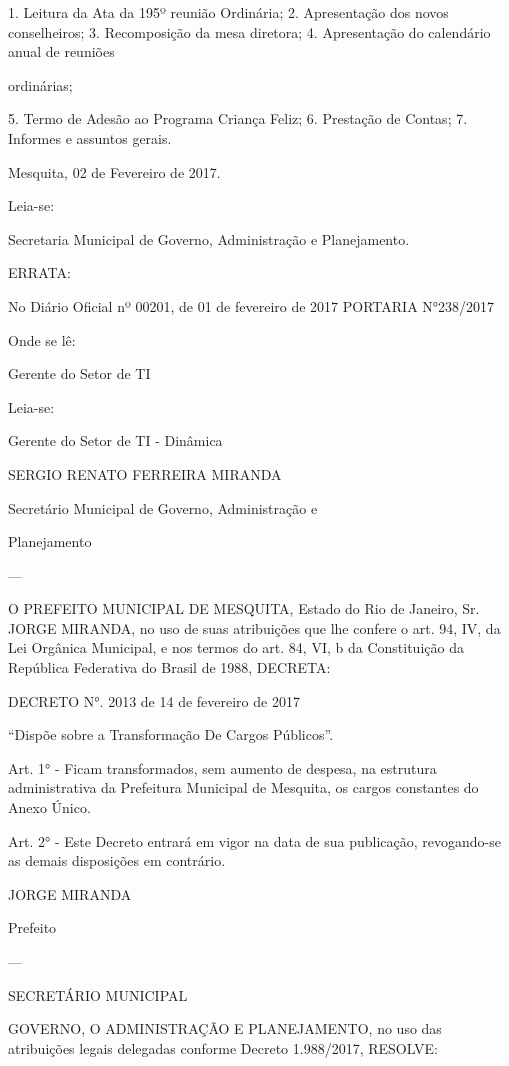\documentclass{doliberto}
\begin{document}
1.  Leitura da Ata da 195º reunião Ordinária; 
2.  Apresentação dos novos conselheiros; 
3.  Recomposição da mesa diretora; 
4.  Apresentação  do  calendário  anual  de  reuniões 

ordinárias; 

5.  Termo de Adesão ao Programa Criança Feliz; 
6.  Prestação de Contas; 
7.  Informes e assuntos gerais. 

Mesquita, 02 de Fevereiro de 2017. 

 
Leia-se: 

Secretaria Municipal de Governo, Administração e 
Planejamento. 

ERRATA: 
 
No Diário Oficial nº 00201, de 01 de fevereiro de 2017 
PORTARIA N°238/2017 
 
Onde se lê: 
 
Gerente do Setor de TI 
 
Leia-se: 
 
Gerente do Setor de TI - Dinâmica 
 
SERGIO RENATO FERREIRA MIRANDA 

Secretário Municipal de Governo, Administração e 

Planejamento 

---

O PREFEITO MUNICIPAL DE MESQUITA, Estado do Rio de 
Janeiro,  Sr.  JORGE  MIRANDA,  no  uso  de  suas  atribuições 
que  lhe  confere  o  art.  94,  IV,  da  Lei  Orgânica  Municipal,  e 
nos  termos  do  art.  84,  VI,  b  da  Constituição  da  República 
Federativa do Brasil de 1988, DECRETA: 

DECRETO N°. 2013 de 14 de fevereiro de 2017 

“Dispõe sobre a Transformação De Cargos Públicos”. 

Art. 1° - Ficam transformados, sem aumento de despesa, na 
estrutura  administrativa  da  Prefeitura  Municipal  de 
Mesquita, os cargos constantes do Anexo Único. 

Art.  2°  -  Este  Decreto  entrará  em  vigor  na  data  de  sua 
publicação,  revogando-se  as  demais  disposições  em 
contrário. 

JORGE MIRANDA 

Prefeito 

---

SECRETÁRIO  MUNICIPAL 

GOVERNO, 
O 
ADMINISTRAÇÃO  E  PLANEJAMENTO,  no  uso  das 
atribuições legais delegadas conforme Decreto 1.988/2017, 
RESOLVE: 
\end{document}
